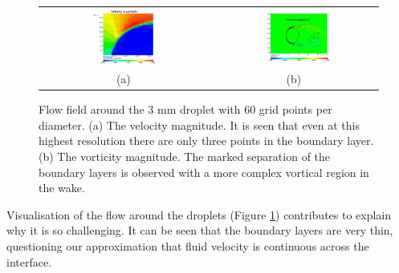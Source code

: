 \begin{figure}
\begin{center}
\begin{tabular}{cc}
\includegraphics[width=0.42\textwidth]{Figures/vel.png}
& \includegraphics[width=0.48\textwidth]{Figures/vort.png} \\
(a) & (b)
\end{tabular}
\end{center}
\caption{Flow field around the 3 mm droplet with 60 grid points per diameter. 
(a) The velocity magnitude. It is seen that even at this highest resolution 
there are only three points in the boundary layer. (b) The vorticity magnitude. 
The marked separation of the boundary layers is observed with 
a more complex vortical region in the wake.}
\label{magn}
\end{figure}
\newcommand\DDD{{\cal D}}
Visualisation of the flow around the droplets (Figure \ref{magn}) 
contributes to explain why it is so challenging. 
It can be seen that the boundary layers are very thin, questioning our 
approximation that fluid velocity is continuous across the interface. 

